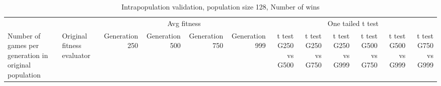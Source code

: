 \clearpage
\begin{landscape}
\thispagestyle{empty}
\setcounter{secnumdepth}{0}
\label{sec:appendixB}

\begin{table}[ht]
  \centering
  \caption{Intrapopulation validation, population size 128, Number of wins}
    \begin{tabularx}{\linewidth}{|p{1in}|p{1in}|r|r|r|r|r|r|r|r|r|r|}
\cline{3-12}    \multicolumn{1}{l}{} &  & \multicolumn{4}{c|}{Avg fitness} & \multicolumn{6}{c|}{One tailed t test} \\ \cline{1-12}
    Number of games per generation in original population
    & Original fitness evaluator 
    & \multicolumn{1}{p{0.7in}|}{Generation 250} 
    & \multicolumn{1}{p{0.7in}|}{Generation 500}
    & \multicolumn{1}{p{0.7in}|}{Generation 750}
    & \multicolumn{1}{p{0.7in}|}{Generation 999}
    & \multicolumn{1}{X|}{t test G250 vs G500} 
    & \multicolumn{1}{X|}{t test G250 vs G750}
    & \multicolumn{1}{X|}{t test G250 vs G999}
    & \multicolumn{1}{X|}{t test G500 vs G750}
    & \multicolumn{1}{X|}{t test G500 vs G999}
    & \multicolumn{1}{X|}{t test G750 vs G999} \\ \cline{1-12}


\end{tabularx}
\end{table}
\end{landscape}
